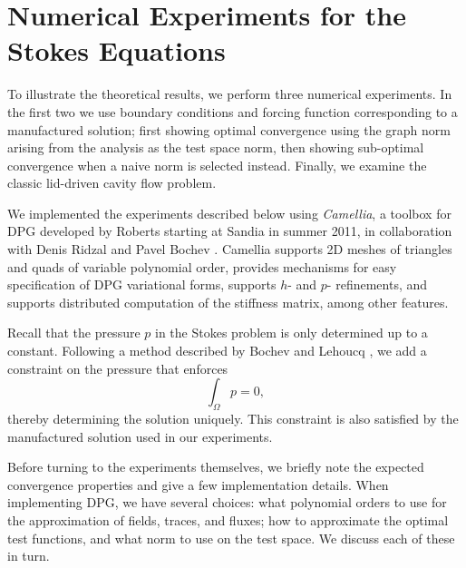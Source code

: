 \section{Numerical Experiments for the Stokes Equations}
\label{sec:StokesNumericalResults}
To illustrate the theoretical results, we perform three numerical
experiments.  In the first two we use boundary conditions and forcing
function corresponding to a manufactured solution; first showing
optimal convergence using the graph norm arising from the analysis as
the test space norm, then showing sub-optimal convergence when a naive
norm is selected instead.  Finally, we examine the classic lid-driven
cavity flow problem.

We implemented the experiments described below using \emph{Camellia}, a toolbox for DPG developed by Roberts starting at Sandia in summer 2011, in collaboration with Denis Ridzal and Pavel Bochev \cite{RobertsEtAl11}.  Camellia supports 2D meshes of triangles and quads of variable polynomial order, provides mechanisms for easy specification of DPG variational forms, supports $h$- and $p$- refinements, and supports distributed computation of the stiffness matrix, among other features.

Recall that the pressure $p$ in the Stokes problem is only determined up to a constant.  Following a method described by Bochev and Lehoucq \cite{BochevLehoucq}, we add a constraint on the pressure that enforces
\[
\int_{\Omega} p = 0,
\]
thereby determining the solution uniquely.  This constraint is also satisfied by the manufactured solution used in our experiments.

Before turning to the experiments themselves, we briefly note the expected convergence properties and give a few implementation details.  When implementing DPG, we have several choices: what polynomial orders to use for the approximation of fields, traces, and fluxes; how to approximate the optimal test functions, and what norm to use on the test space.  We discuss each of these in turn.

